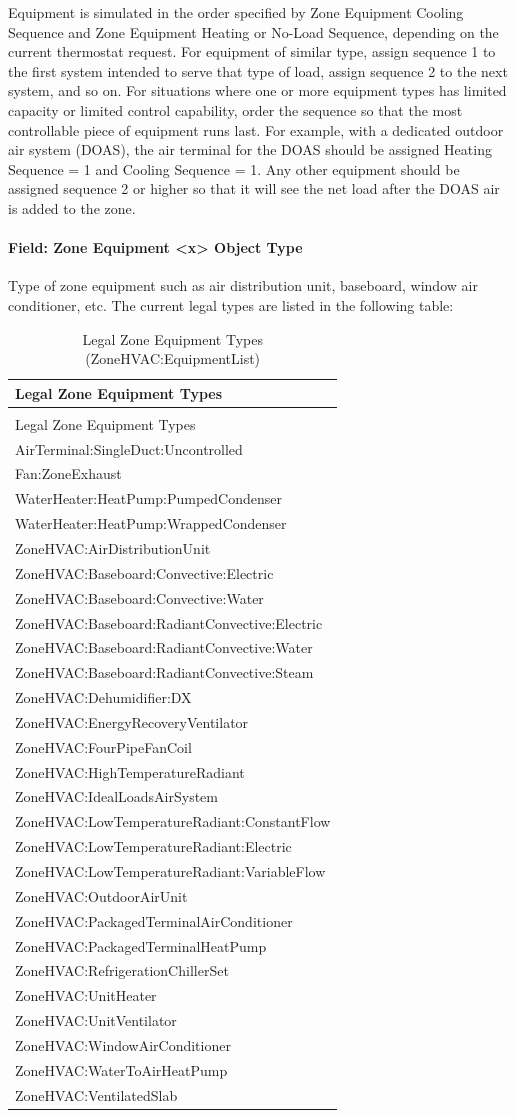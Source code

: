 Equipment is simulated in the order specified by Zone Equipment Cooling Sequence and Zone Equipment Heating or No-Load Sequence, depending on the current thermostat request. For equipment of similar type, assign sequence 1 to the first system intended to serve that type of load, assign sequence 2 to the next system, and so on. For situations where one or more equipment types has limited capacity or limited control capability, order the sequence so that the most controllable piece of equipment runs last. For example, with a dedicated outdoor air system (DOAS), the air terminal for the DOAS should be assigned Heating Sequence = 1 and Cooling Sequence = 1. Any other equipment should be assigned sequence 2 or higher so that it will see the net load after the DOAS air is added to the zone.

\paragraph{Field: Zone Equipment \textless{}x\textgreater{} Object Type}\label{field-zone-equipment-x-object-type}

Type of zone equipment such as air distribution unit, baseboard, window air conditioner, etc. The current legal types are listed in the following table:

\begin{longtable}[c]{@{}l@{}}
\caption{Legal Zone Equipment Types (ZoneHVAC:EquipmentList) \label{table:legal-zone-equipment-types-zonehvac}} \tabularnewline
\toprule
Legal Zone Equipment Types \tabularnewline
\midrule
\endfirsthead

\caption[]{Legal Zone Equipment Types (ZoneHVAC:EquipmentList)} \tabularnewline
\toprule
Legal Zone Equipment Types \tabularnewline
\midrule
\endhead

AirTerminal:SingleDuct:Uncontrolled \tabularnewline
Fan:ZoneExhaust \tabularnewline
WaterHeater:HeatPump:PumpedCondenser \tabularnewline
WaterHeater:HeatPump:WrappedCondenser \tabularnewline
ZoneHVAC:AirDistributionUnit \tabularnewline
ZoneHVAC:Baseboard:Convective:Electric \tabularnewline
ZoneHVAC:Baseboard:Convective:Water \tabularnewline
ZoneHVAC:Baseboard:RadiantConvective:Electric \tabularnewline
ZoneHVAC:Baseboard:RadiantConvective:Water \tabularnewline
ZoneHVAC:Baseboard:RadiantConvective:Steam \tabularnewline
ZoneHVAC:Dehumidifier:DX \tabularnewline
ZoneHVAC:EnergyRecoveryVentilator \tabularnewline
ZoneHVAC:FourPipeFanCoil \tabularnewline
ZoneHVAC:HighTemperatureRadiant \tabularnewline
ZoneHVAC:IdealLoadsAirSystem \tabularnewline
ZoneHVAC:LowTemperatureRadiant:ConstantFlow \tabularnewline
ZoneHVAC:LowTemperatureRadiant:Electric \tabularnewline
ZoneHVAC:LowTemperatureRadiant:VariableFlow \tabularnewline
ZoneHVAC:OutdoorAirUnit \tabularnewline
ZoneHVAC:PackagedTerminalAirConditioner \tabularnewline
ZoneHVAC:PackagedTerminalHeatPump \tabularnewline
ZoneHVAC:RefrigerationChillerSet \tabularnewline
ZoneHVAC:UnitHeater \tabularnewline
ZoneHVAC:UnitVentilator \tabularnewline
ZoneHVAC:WindowAirConditioner \tabularnewline
ZoneHVAC:WaterToAirHeatPump \tabularnewline
ZoneHVAC:VentilatedSlab \tabularnewline
\bottomrule
\end{longtable}

